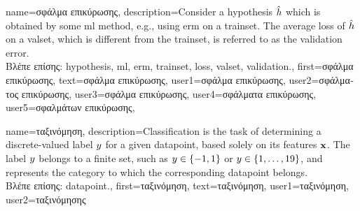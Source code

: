 {name={\foreignlanguage{greek}{σφάλμα επικύρωσης}},
 description={Consider a \gls{hypothesis} $\hat{h}$ which is 
 	obtained by some \gls{ml} method, e.g., using \gls{erm} on a \gls{trainset}. The average \gls{loss} 
 	of $\hat{h}$ on a \gls{valset}, which is different from the \gls{trainset}, is referred 
 	to as the \gls{validation} error.\\
	\foreignlanguage{greek}{Βλέπε επίσης:} \gls{hypothesis}, \gls{ml}, \gls{erm}, \gls{trainset}, \gls{loss}, \gls{valset}, \gls{validation}.},
	first={\foreignlanguage{greek}{σφάλμα επικύρωσης}},
	text={\foreignlanguage{greek}{σφάλμα επικύρωσης}},
	user1={\foreignlanguage{greek}{σφάλμα επικύρωσης}}, %
	user2={\foreignlanguage{greek}{σφάλματος επικύρωσης}}, %
	user3={\foreignlanguage{greek}{σφάλμα επικύρωσης}}, %
	user4={\foreignlanguage{greek}{σφάλματα επικύρωσης}}, %
	user5={\foreignlanguage{greek}{σφαλμάτων επικύρωσης}}, %
}

{name={\foreignlanguage{greek}{ταξινόμηση}},
 description={Classification is the task of determining a 
 	discrete-valued label $y$ for a given \gls{datapoint}, based solely on its 
 	features ${\bf x}$. The label $y$ belongs to a finite set, such as 
 	$y \in \{-1,1\}$ or $y \in \{1,\ldots,19\}$, and represents the 
 	category to which the corresponding \gls{datapoint} belongs.\\
	\foreignlanguage{greek}{Βλέπε επίσης:} \gls{datapoint}.},
	first={\foreignlanguage{greek}{ταξινόμηση}},
	text={\foreignlanguage{greek}{ταξινόμηση}},
	user1={\foreignlanguage{greek}{ταξινόμηση}}, %
	user2={\foreignlanguage{greek}{ταξινόμησης}} %
}

